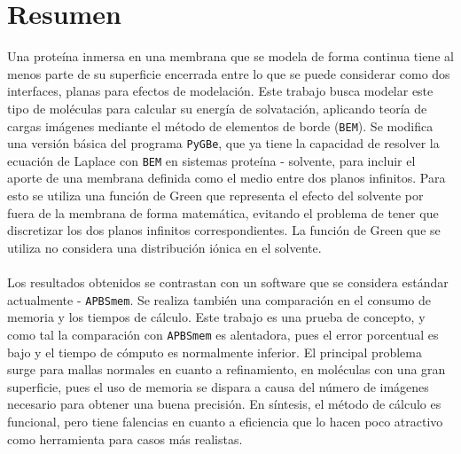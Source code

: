 \section*{Resumen}
\noindent
Una proteína inmersa en una membrana que se modela de forma continua tiene al menos parte de su superficie encerrada entre lo que se puede considerar como dos interfaces, planas para efectos de modelación. Este trabajo busca modelar este tipo de moléculas para calcular su energía de solvatación, aplicando teoría de cargas imágenes mediante el método de elementos de borde (\texttt{BEM}). Se modifica una versión básica del programa \texttt{PyGBe}, que ya tiene la capacidad de resolver la ecuación de Laplace con \texttt{BEM} en sistemas proteína - solvente, para incluir el aporte de una membrana definida como el medio entre dos planos infinitos. Para esto se utiliza una función de Green que representa el efecto del solvente por fuera de la membrana de forma matemática, evitando el problema de tener que discretizar los dos planos infinitos correspondientes. La función de Green que se utiliza no considera una distribución iónica en el solvente.\\\\
Los resultados obtenidos se contrastan con un software que se considera estándar actualmente - \texttt{APBSmem}. Se realiza también una comparación en el consumo de memoria y los tiempos de cálculo. Este trabajo es una prueba de concepto, y como tal la comparación con \texttt{APBSmem} es alentadora, pues el error porcentual es bajo y el tiempo de cómputo es normalmente inferior. El principal problema surge para mallas normales en cuanto a refinamiento, en moléculas con una gran superficie, pues el uso de memoria se dispara a causa del número de imágenes necesario para obtener una buena precisión. En síntesis, el método de cálculo es funcional, pero tiene falencias en cuanto a eficiencia que lo hacen poco atractivo como herramienta para casos más realistas.